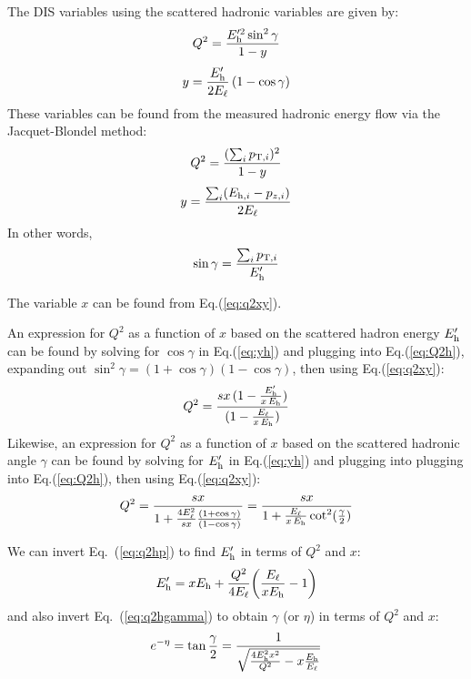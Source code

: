 \documentclass[12pt]{article}
\begin{document}
The DIS variables using the scattered hadronic variables are given by:
%
\begin{equation}
Q^2 = {E^{\prime 2}_{\rm h} \sin^2\gamma \over 1-y}
\label{eq:Q2h}
\end{equation}
\begin{equation}
y = {E^\prime_{\rm h} \over 2 E_\ell} \, (1-\cos\gamma)
\label{eq:yh}
\end{equation}
%
These variables
can be found from the measured hadronic energy flow via the Jacquet-Blondel
method:
%
\begin{equation}
Q^2 = {(\sum_i p_{{\rm T},i})^2 \over 1-y}
  \label{eq:jbmethq}
\end{equation}
\begin{equation}
y = {\sum_i (E_{{\rm h},i}-p_{z,i}) \over 2 E_\ell}
  \label{eq:jbmethy}
\end{equation}
%
In other words,
%
\begin{equation}
  \sin\gamma = {\sum_i p_{{\rm T},i} \over E^\prime_{\rm h}}
  \end{equation} 
%

The variable $x$ can be found from Eq.(\ref{eq:q2xy}). 

An expression for $Q^2$ as a function of $x$ based on the scattered
hadron energy $E^\prime_{\rm h}$ can be found by solving for $\cos\gamma$
in Eq.(\ref{eq:yh}) and plugging into Eq.(\ref{eq:Q2h}), expanding out
$\sin^2\gamma = (1+\cos\gamma)(1-\cos\gamma)$,
then using
Eq.(\ref{eq:q2xy}):
%
\begin{equation}
  Q^2 = {sx\,(1-{E^\prime_{\rm h} \over x\,E_{\rm h}}) \over 
      (1-{E_\ell \over x\,E_{\rm h}})}
\label{eq:q2hp}
\end{equation}
%
Likewise, an expression for $Q^2$ as a function of $x$ based on the
scattered hadronic angle $\gamma$ can be found by solving for $E^\prime_{\rm h}$ in
Eq.(\ref{eq:yh}) and plugging into plugging into Eq.(\ref{eq:Q2h}), then using
Eq.(\ref{eq:q2xy}):
%
\begin{equation}
Q^2 = {sx \over {1 + {4E^2_\ell \over sx} }{(1+\cos\gamma)
    \over (1-\cos\gamma) } } = {sx \over {1 + {E_\ell \over x\, E_{\rm h}} \cot^2({\gamma \over 2}) } }
\label{eq:q2hgamma}
\end{equation}

We can invert Eq.~(\ref{eq:q2hp}) to find $E^\prime_{\rm h}$ in terms of $Q^2$ and $x$:
%
\begin{equation}
E^\prime_{\rm h}  = xE_{\rm h} + {Q^2 \over 4 E_\ell}\bigg({E_\ell \over x E_{\rm h}} - 1 \bigg)
\label{eq:hp}
\end{equation}
%
and also invert Eq.~(\ref{eq:q2hgamma}) to obtain $\gamma$ (or $\eta$) in terms of $Q^2$ and $x$:
%
\begin{equation}
e^{-\eta} = \tan {\gamma \over 2}   = { 1 \over \sqrt{{4E_{\rm h}^2 x^2 \over Q^2} - x {E_{\rm h} \over E_\ell} }  }  
\label{eq:gamma}
\end{equation}
%
\end{document}
